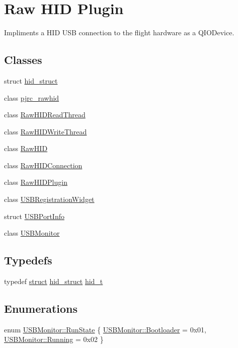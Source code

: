 \hypertarget{group___raw_h_i_d_plugin}{\section{Raw H\-I\-D Plugin}
\label{group___raw_h_i_d_plugin}
}


Impliments a H\-I\-D U\-S\-B connection to the flight hardware as a Q\-I\-O\-Device.  


\subsection*{Classes}
\begin{DoxyCompactItemize}
\item 
struct \hyperlink{structhid__struct}{hid\-\_\-struct}
\item 
class \hyperlink{classpjrc__rawhid}{pjrc\-\_\-rawhid}
\item 
class \hyperlink{class_raw_h_i_d_read_thread}{Raw\-H\-I\-D\-Read\-Thread}
\item 
class \hyperlink{class_raw_h_i_d_write_thread}{Raw\-H\-I\-D\-Write\-Thread}
\item 
class \hyperlink{class_raw_h_i_d}{Raw\-H\-I\-D}
\item 
class \hyperlink{class_raw_h_i_d_connection}{Raw\-H\-I\-D\-Connection}
\item 
class \hyperlink{class_raw_h_i_d_plugin}{Raw\-H\-I\-D\-Plugin}
\item 
class \hyperlink{class_u_s_b_registration_widget}{U\-S\-B\-Registration\-Widget}
\item 
struct \hyperlink{struct_u_s_b_port_info}{U\-S\-B\-Port\-Info}
\item 
class \hyperlink{class_u_s_b_monitor}{U\-S\-B\-Monitor}
\end{DoxyCompactItemize}
\subsection*{Typedefs}
\begin{DoxyCompactItemize}
\item 
typedef \hyperlink{sdlgamepad_8dox_aba655c5729da86df745f0c8e7f9ba8d2}{struct} \hyperlink{structhid__struct}{hid\-\_\-struct} \hyperlink{group___raw_h_i_d_plugin_gace038be945e544c81ea45cabfb08655b}{hid\-\_\-t}
\end{DoxyCompactItemize}
\subsection*{Enumerations}
\begin{DoxyCompactItemize}
\item 
enum \hyperlink{group___raw_h_i_d_plugin_gaff6bf8945a7cdab907cf5adc29bec064}{U\-S\-B\-Monitor\-::\-Run\-State} \{ \hyperlink{group___raw_h_i_d_plugin_ggaff6bf8945a7cdab907cf5adc29bec064ac18f9b621b18e8d33c36467a92dd0dc9}{U\-S\-B\-Monitor\-::\-Bootloader} = 0x01, 
\hyperlink{group___raw_h_i_d_plugin_ggaff6bf8945a7cdab907cf5adc29bec064a1a9efe940184d4bec69cb5d343eaaf81}{U\-S\-B\-Monitor\-::\-Running} = 0x02
 \}
\end{DoxyCompactItemize}
